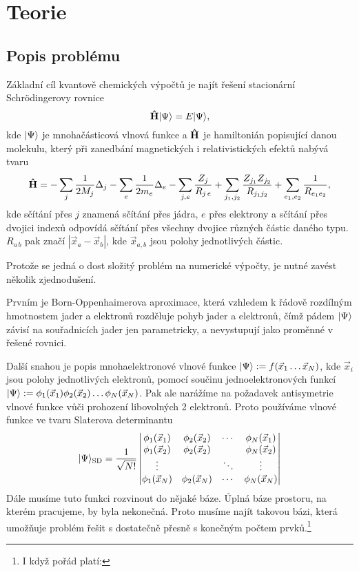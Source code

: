 \chapter{Teorie}
\section{Popis problému}
\label{approx}
Základní cíl kvantově chemických výpočtů je najít řešení stacionární Schrödingerovy rovnice
\begin{equation}
\mathbf{\hat{H}}| \Psi \rangle = E| \Psi \rangle,
\end{equation}
kde $| \Psi \rangle$ je mnohačásticová vlnová funkce a $\mathbf{\hat{H}}$ je hamiltonián popisující 
danou molekulu, který při zanedbání magnetických i relativistických efektů nabývá tvaru
\begin{equation}
\mathbf{\hat{H}} =-\sum_{j}\frac{1}{2M_j}\Delta_j 
-\sum_{e}\frac{1}{2m_e}\Delta_e
 -\sum_{j,e} \frac{Z_{j}}{R_{j\,e}}
 +\sum_{j_1,j_2} \frac{Z_{j_1}Z_{j_2}}{R_{j_1 j_2}} 
 +\sum_{e_1,e_2} \frac{1}{R_{e_1 e_2}},
\end{equation}
kde sčítání přes $j$ znamená sčítání přes jádra, $e$ přes elektrony a sčítání přes 
dvojici indexů odpovídá sčítání přes všechny dvojice různých částic daného typu. 
$R_{a\,b}$ pak značí $|\vec{x}_a - \vec{x}_b|$, kde $\vec{x}_{a,b}$ jsou polohy 
jednotlivých částic.

Protože se jedná o dost složitý problém na numerické výpočty, je nutné zavést 
několik zjednodušení. 

Prvním je Born-Oppenhaimerova aproximace, která vzhledem k řádově 
rozdílným hmotnostem jader a elektronů rozděluje pohyb jader a elektronů, čímž pádem 
$| \Psi \rangle$ závisí na souřadnicích jader jen parametricky, 
a nevystupují jako proměnné v 
řešené rovnici. 

Další snahou je popis mnohaelektronové vlnové funkce
$| \Psi \rangle:= f(\vec{x}_1 \dots \vec{x}_N)$, kde $\vec{x}_i$ jsou 
polohy jednotlivých elektronů, pomocí součinu jednoelektronových funkcí
$| \Psi \rangle:= \phi_1(\vec{x}_1)\phi_2(\vec{x}_2)\dots \phi_N(\vec{x}_N)$.
Pak ale narážíme na požadavek antisymetrie vlnové funkce vůči prohození libovolných 2 
elektronů. Proto používáme vlnové funkce ve tvaru Slaterova determinantu
\begin{equation}
| \Psi \rangle_{\mathrm{SD}} = \frac{1}{\sqrt{N!}}\begin{vmatrix}
\phi_1(\vec{x}_1) & \phi_2(\vec{x}_2)& \cdots & \phi_N(\vec{x}_1) \\
\phi_1(\vec{x}_2) & \phi_2(\vec{x}_2)&        & \phi_N(\vec{x}_2)\\
\vdots         &               & \ddots & \vdots \\
\phi_1(\vec{x}_N) & \phi_2(\vec{x}_N)& \cdots & \phi_N(\vec{x}_N)
\end{vmatrix}
\end{equation}
Dále musíme tuto funkci rozvinout do nějaké báze. Úplná báze prostoru, na kterém 
pracujeme, by byla nekonečná. Proto musíme najít takovou bázi, která umožňuje problém 
řešit s dostatečně přesně s konečným počtem prvků.\footnote{I když pořád platí: }
